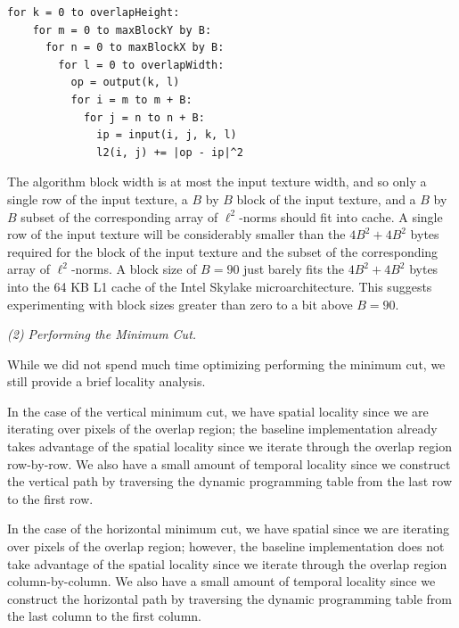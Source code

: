 \documentclass[letterpaper]{article}
\begin{document}
\begin{lstlisting}[style=cppstyle]
  for k = 0 to overlapHeight:
    for m = 0 to maxBlockY by B:
      for n = 0 to maxBlockX by B:
        for l = 0 to overlapWidth:
          op = output(k, l)
          for i = m to m + B:
            for j = n to n + B:
              ip = input(i, j, k, l)
              l2(i, j) += |op - ip|^2
\end{lstlisting}

The algorithm block width is at most the input texture width, and so only a single row of the input texture, a $B$ by $B$ block of the input texture, and a $B$ by $B$ subset of the corresponding array of $\ell ^2$-norms should fit into cache. A single row of the input texture will be considerably smaller than the $4B^2 + 4B^2$ bytes required for the block of the input texture and the subset of the corresponding array of $\ell ^2$-norms. A block size of $B = 90$ just barely fits the $4B^2 + 4B^2$ bytes into the 64 KB L1 cache of the Intel Skylake microarchitecture. This suggests experimenting with block sizes greater than zero to a bit above $B=90$.

\textit{(2) Performing the Minimum Cut.}

While we did not spend much time optimizing performing the minimum cut, we still provide a brief locality analysis.

In the case of the vertical minimum cut, we have spatial locality since we are iterating over pixels of the overlap region; the baseline implementation already takes advantage of the spatial locality since we iterate through the overlap region row-by-row. We also have a small amount of temporal locality since we construct the vertical path by traversing the dynamic programming table from the last row to the first row.

In the case of the horizontal minimum cut, we have spatial since we are iterating over pixels of the overlap region; however, the baseline implementation does not take advantage of the spatial locality since we iterate through the overlap region column-by-column. We also have a small amount of temporal locality since we construct the horizontal path by traversing the dynamic programming table from the last column to the first column.
\end{document}
